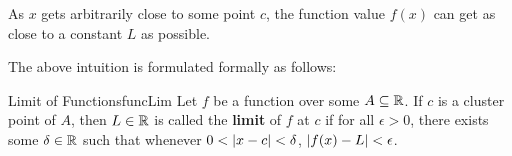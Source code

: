 \documentclass[math]{amznotes}
\theoremstyle{remark}
\begin{document}
As $x$ gets arbitrarily close to some point $c$, the function value $f(x)$ can get as close to a constant $L$ as possible.

The above intuition is formulated formally as follows:
\begin{dfnbox}{Limit of Functions}{funcLim}
    Let $f$ be a function over some $A \subseteq \mathbb{R}$. If $c$ is a cluster point of $A$, then $L \in \mathbb{R}$ is called the {\color{red} \textbf{limit}} of $f$ at $c$ if for all $\epsilon > 0$, there exists some $\delta \in \mathbb{R}$ such that whenever $0 < {\left\lvert {x - c} \right\rvert} < \delta$, ${\left\lvert {f(x) - L} \right\rvert} < \epsilon$. 
\end{dfnbox}
\end{document}
